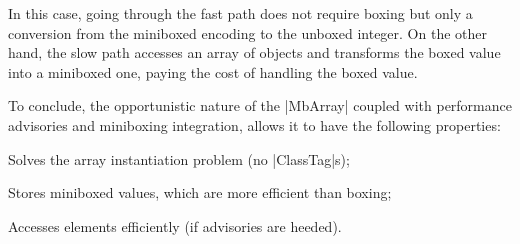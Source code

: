 In this case, going through the fast path does not require boxing but only a conversion from the miniboxed encoding to the unboxed integer. On the other hand, the slow path accesses an array of objects and transforms the boxed value into a miniboxed one, paying the cost of handling the boxed value.


To conclude, the opportunistic nature of the |MbArray| coupled with performance advisories and miniboxing integration, allows it to have the following properties:
\begin{compactitem}
  \item Solves the array instantiation problem (no |ClassTag|s);
  \item Stores miniboxed values, which are more efficient than boxing;
  \item Accesses elements efficiently (if advisories are heeded).
\end{compactitem}

